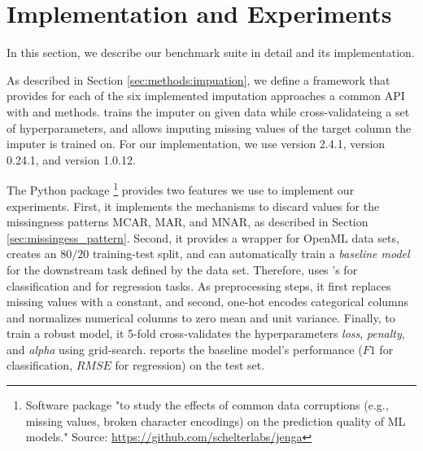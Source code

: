 \section{Implementation and Experiments}
\label{sec:implementation}
%
In this section, we describe our benchmark suite in detail and its implementation.

As described in Section \ref{sec:methods:impuation}, we define a framework that provides for each of the six implemented imputation approaches a common API with  and  methods.  trains the imputer on given data while cross-validateing a set of hyperparameters, and  allows imputing missing values of the target column the imputer is trained on. For our implementation, we use  version 2.4.1,  version 0.24.1, and  version 1.0.12.

The Python package \footnote{Software package "to study the effects of common data corruptions (e.g., missing values, broken character encodings) on the prediction quality of ML models." Source: \url{https://github.com/schelterlabs/jenga}} \citep{Jenga} provides two features we use to implement our experiments. First, it implements the mechanisms to discard values for the missingness patterns MCAR, MAR, and MNAR, as described in Section \ref{sec:missingess_pattern}. Second, it provides a wrapper for OpenML data sets, creates an $80/20$ training-test split, and can automatically train a \emph{baseline model} for the downstream task defined by the data set. Therefore,  uses 's  for classification and  for regression tasks. As preprocessing steps, it first replaces missing values with a constant, and second, one-hot encodes categorical columns and normalizes numerical columns to zero mean and unit variance. Finally, to train a robust model, it 5-fold cross-validates the hyperparameters \emph{loss}, \emph{penalty}, and \emph{alpha} using grid-search.  reports the baseline model's performance ($F1$ for classification, $RMSE$ for regression) on the test set.


